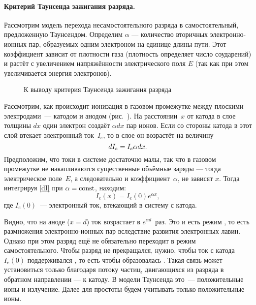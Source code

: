 \paragraph{Критерий Таунсенда зажигания разряда.}
Рассмотрим модель перехода несамостоятельного разряда в самостоятельный,
предложенную Таунсендом.
Определим  $\alpha$ ---
количество вторичных электронно-ионных пар, образуемых одним электроном
на единице длины пути.
Этот коэффициент зависит от плотности газа
(плотность определяет число соударений)
и растёт с увеличением напряжённости электрического поля $E$
(так как при этом увеличивается энергия электронов).

\begin{figure}[h!]
    \centering
    \caption{К выводу критерия Таунсенда зажигания разряда}
\end{figure}

Рассмотрим, как происходит ионизация в газовом промежутке между плоскими
электродами~--- катодом и анодом (рис.~). На
расстоянии~$x$ от катода в слое толщины $dx$ один электрон создаёт $\alpha dx$
пар ионов. Если со стороны катода в этот
слой втекает электронный ток~$I_e$, то в слое он возрастёт на величину
\begin{equation*}
\eqmark{dI}
dI_e=I_e\alpha dx.
\end{equation*}
Предположим, что токи в системе достаточно малы, так что в газовом промежутке
не накапливаются существенные объёмные заряды --- тогда электрическое поле~$E$,
а следовательно и коэффициент~$\alpha$, не зависят $x$.
Тогда интегрируя \eqref{dI} при $\alpha=\mathrm{const}$, находим:
\begin{equation*}
	I_e(x)=I_e(0)e^{\alpha x},
\end{equation*}
где $I_e(0)$~--- электронный ток, втекающий в систему с катода.

Видно, что на аноде ($x=d$) ток возрастает в $e^{\alpha d}$~раз.
Это и есть режим , то есть размножения
электронно-ионных пар вследствие развития
электронных лавин. Однако при этом разряд ещё не обязательно переходит в режим
самостоятельного. Чтобы разряд не прекращался, нужно,
чтобы ток с катода $I_e(0)$ поддерживался ,
то есть чтобы образовалась .
Такая связь может установиться только благодаря потоку частиц, двигающихся
из разряда в обратном направлении --- к катоду. В модели Таунсенда это~---
положительные ионы и излучение. Далее для простоты будем учитывать только положительные ионы.

